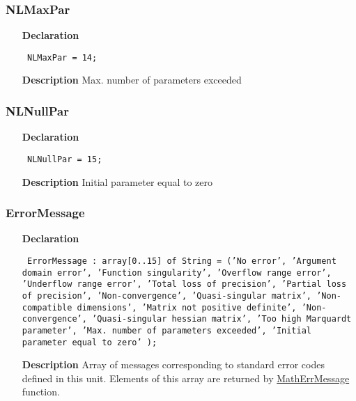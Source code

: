 \documentclass[12pt,a4paper,oneside]{report}
\newcommand{\lmath}[1]{   %
	\marginpar{\vspace{#1} 
		\begin{flushright}
			LMath
	\end{flushright} }
}
\newcommand{\declarationitem}[1]{\textbf{#1}}
\newcommand{\descriptiontitle}[1]{\textbf{#1}}
\newcommand{\code}[1]{\texttt{#1}}
\begin{document}
\subsubsection{NLMaxPar}
\label{uErrors-NLMaxPar}
\begin{itemize}\item[\declarationitem{Declaration}\hfill]
	\begin{flushleft}
		\code{
			NLMaxPar  = 14;}
		
	\end{flushleft}
	
	\par
	\item[\descriptiontitle{Description}]
	Max. number of parameters exceeded
	
\end{itemize}
\subsubsection{NLNullPar}
\label{uErrors-NLNullPar}
\begin{itemize}\item[\declarationitem{Declaration}\hfill]
	\begin{flushleft}
		\code{
			NLNullPar = 15;}
		
	\end{flushleft}
	
	\par
	\item[\descriptiontitle{Description}]
	Initial parameter equal to zero
	
\end{itemize}
\subsubsection{ErrorMessage}
\lmath{-24pt}
\label{uErrors-ErrorMessage}
\begin{itemize}\item[\declarationitem{Declaration}\hfill]
	\begin{flushleft}
		\code{
			ErrorMessage : array[0..15] of String =
			('No error',
			'Argument domain error',
			'Function singularity',
			'Overflow range error',
			'Underflow range error',
			'Total loss of precision',
			'Partial loss of precision',
			'Non-convergence',
			'Quasi-singular matrix',
			'Non-compatible dimensions',
			'Matrix not positive definite',
			'Non-convergence',
			'Quasi-singular hessian matrix',
			'Too high Marquardt parameter',
			'Max. number of parameters exceeded',
			'Initial parameter equal to zero'
			);}
	\end{flushleft}
\item[\descriptiontitle{Description}] Array of messages corresponding to standard error codes defined in this unit. Elements of this array are returned by \hyperref[uErrors-MathErrMessage]{MathErrMessage} function.	
\end{itemize}
\end{document}

